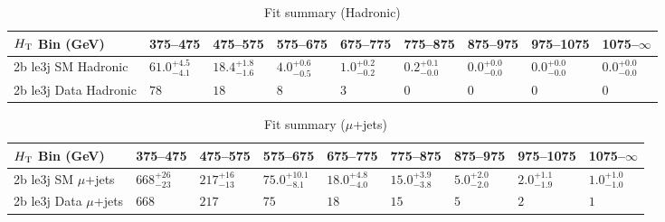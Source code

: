 \documentclass[8pt]{article}
\def\scalht{\mbox{$H_{\rm{T}}$}\xspace}
\newcommand\T{\rule{0pt}{2.6ex}}
\begin{document}
\begin{table}[ht!]
\caption{Fit summary (Hadronic)}
\label{tab:ensemble-summary}
\centering
\begin{tabular}{ lllllllll }

\hline
\scalht Bin (GeV)       & 375--475                       & 475--575                       & 575--675                       & 675--775                       & 775--875                       & 875--975                       & 975--1075                      & 1075--$\infty$                 \\ [1.000000ex]
\hline
2b le3j SM Hadronic\T   & $61.0^{+4.5}_{-4.1}$           & $18.4^{+1.8}_{-1.6}$           & $4.0^{+0.6}_{-0.5}$            & $1.0^{+0.2}_{-0.2}$            & $0.2^{+0.1}_{-0.0}$            & $0.0^{+0.0}_{-0.0}$            & $0.0^{+0.0}_{-0.0}$            & $0.0^{+0.0}_{-0.0}$            \\ 
2b le3j Data Hadronic\T & $78$                           & $18$                           & $8$                            & $3$                            & $0$                            & $0$                            & $0$                            & $0$                            \\ 
\hline

\end{tabular}
\end{table}
\begin{table}[ht!]
\caption{Fit summary ($\mu$+jets)}
\label{tab:ensemble-summary}
\centering
\begin{tabular}{ lllllllll }

\hline
\scalht Bin (GeV)       & 375--475                       & 475--575                       & 575--675                       & 675--775                       & 775--875                       & 875--975                       & 975--1075                      & 1075--$\infty$                 \\ [1.000000ex]
\hline
2b le3j SM $\mu$+jets\T & $668^{+26}_{-23}$              & $217^{+16}_{-13}$              & $75.0^{+10.1}_{-8.1}$          & $18.0^{+4.8}_{-4.0}$           & $15.0^{+3.9}_{-3.8}$           & $5.0^{+2.0}_{-2.0}$            & $2.0^{+1.1}_{-1.9}$            & $1.0^{+1.0}_{-1.0}$            \\ 
2b le3j Data $\mu$+jets\T & $668$                          & $217$                          & $75$                           & $18$                           & $15$                           & $5$                            & $2$                            & $1$                            \\ 
\hline

\end{tabular}
\end{table}
\end{document}

